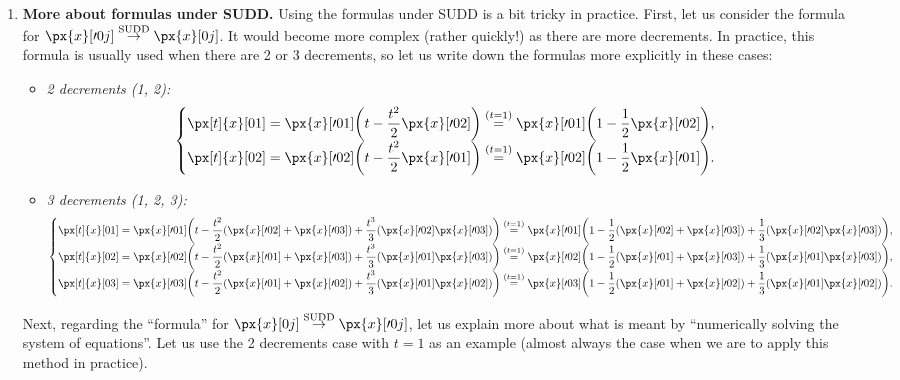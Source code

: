 \begin{enumerate}
\item \textbf{More about formulas under SUDD.} Using the formulas under SUDD is
a bit tricky in practice. First, let us consider the formula for
\(\px{x}[\prime 0j]\overset{\text{SUDD}}{\to}\px{x}[0j]\). It would become more
complex (rather quickly!) as there are more decrements. In practice, this
formula is usually used when there are 2 or 3 decrements, so let us write down
the formulas more explicitly in these cases:
\begin{itemize}
\item \emph{2 decrements (1, 2):}
\[
\begin{cases}
\displaystyle \px[t]{x}[01]=\px{x}[\prime 01]\qty(t-\frac{t^{2}}{2}\px{x}[\prime 02])
\overset{(t=1)}{=}\px{x}[\prime 01]\qty(1-\frac{1}{2}\px{x}[\prime 02]), \\
\displaystyle \px[t]{x}[02]=\px{x}[\prime 02]\qty(t-\frac{t^{2}}{2}\px{x}[\prime 01])
\overset{(t=1)}{=}\px{x}[\prime 02]\qty(1-\frac{1}{2}\px{x}[\prime 01]).
\end{cases}
\]
\item \emph{3 decrements (1, 2, 3):}
\[
\begin{cases}
\displaystyle \px[t]{x}[01]=\px{x}[\prime 01]\qty(t-\frac{t^{2}}{2}\qty(\px{x}[\prime 02]+\px{x}[\prime 03])
+\frac{t^3}{3}\qty(\px{x}[\prime 02]\px{x}[\prime 03]))
\overset{(t=1)}{=}\px{x}[\prime 01]\qty(1-\frac{1}{2}\qty(\px{x}[\prime 02]+\px{x}[\prime 03])
+\frac{1}{3}\qty(\px{x}[\prime 02]\px{x}[\prime 03])), \\

\displaystyle \px[t]{x}[02]=\px{x}[\prime 02]\qty(t-\frac{t^{2}}{2}\qty(\px{x}[\prime 01]+\px{x}[\prime 03])
+\frac{t^3}{3}\qty(\px{x}[\prime 01]\px{x}[\prime 03]))
\overset{(t=1)}{=}\px{x}[\prime 02]\qty(1-\frac{1}{2}\qty(\px{x}[\prime 01]+\px{x}[\prime 03])
+\frac{1}{3}\qty(\px{x}[\prime 01]\px{x}[\prime 03])), \\

\displaystyle \px[t]{x}[03]=\px{x}[\prime 03]\qty(t-\frac{t^{2}}{2}\qty(\px{x}[\prime 01]+\px{x}[\prime 02])
+\frac{t^3}{3}\qty(\px{x}[\prime 01]\px{x}[\prime 02]))
\overset{(t=1)}{=}\px{x}[\prime 03]\qty(1-\frac{1}{2}\qty(\px{x}[\prime 01]+\px{x}[\prime 02])
+\frac{1}{3}\qty(\px{x}[\prime 01]\px{x}[\prime 02])).
\end{cases}
\]
\end{itemize}

Next, regarding the ``formula'' for
\(\px{x}[0j]\overset{\text{SUDD}}{\to}\px{x}[\prime 0j]\), let us explain more
about what is meant by ``numerically solving the system of equations''. Let us
use the 2 decrements case with \(t=1\) as an example (almost always the case when we are to
apply this method in practice).


\end{enumerate}
